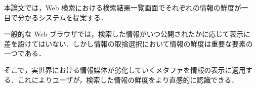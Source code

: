

\begin{jabstract}

本論文では，Web 検索における検索結果一覧画面でそれぞれの情報の鮮度が一目で分かるシステムを提案する．

一般的な Web ブラウザでは，検索した情報がいつ公開されたかに応じて表示に差を設けてはいない．しかし情報の取捨選択において情報の鮮度は重要な要素の一つである．

そこで，実世界における情報媒体が劣化していくメタファを情報の表示に適用する．これによりユーザが，検索した情報の鮮度をより直感的に認識できる．

\end{jabstract}
